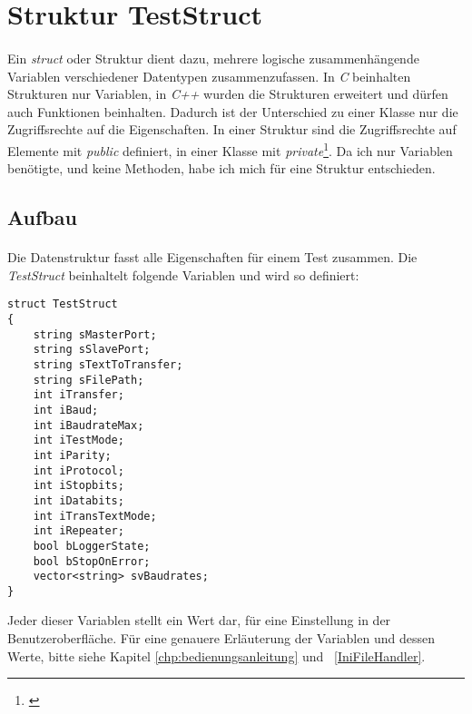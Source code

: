 \section{Struktur TestStruct}\label{TestStruct}
\paragraph{}
Ein \textit{struct} oder Struktur dient dazu, mehrere logische zusammenhängende Variablen verschiedener Datentypen zusammenzufassen. In \textit{C} beinhalten Strukturen nur Variablen, in \textit{C++} wurden die Strukturen erweitert und dürfen auch Funktionen beinhalten. Dadurch ist der Unterschied zu einer Klasse nur die Zugriffsrechte auf die Eigenschaften. In einer Struktur sind die Zugriffsrechte auf Elemente mit  \textit{public} definiert, in einer Klasse mit \textit{private}\footnote{\cite{VisualC++}}. Da ich nur Variablen benötigte, und keine Methoden, habe ich mich für eine Struktur entschieden.


\subsection{Aufbau}
\paragraph{}
Die Datenstruktur fasst alle Eigenschaften für einem Test zusammen. Die \textit{TestStruct} beinhaltelt folgende Variablen und wird so definiert:\\

\begin{lstlisting}	 
struct TestStruct
{
	string sMasterPort;
	string sSlavePort;
	string sTextToTransfer;
	string sFilePath;
	int iTransfer;
	int iBaud;
	int iBaudrateMax;
	int iTestMode;
	int iParity;
	int iProtocol;
	int iStopbits;
	int iDatabits;
	int iTransTextMode;
	int iRepeater;
	bool bLoggerState;
	bool bStopOnError;
	vector<string> svBaudrates;
}
\end{lstlisting}

Jeder dieser Variablen stellt ein Wert dar, für eine Einstellung in der Benutzeroberfläche. Für eine genauere Erläuterung der Variablen und dessen Werte, bitte siehe Kapitel \ref{chp:bedienungsanleitung} und ~\ref{IniFileHandler}.

\newpage



